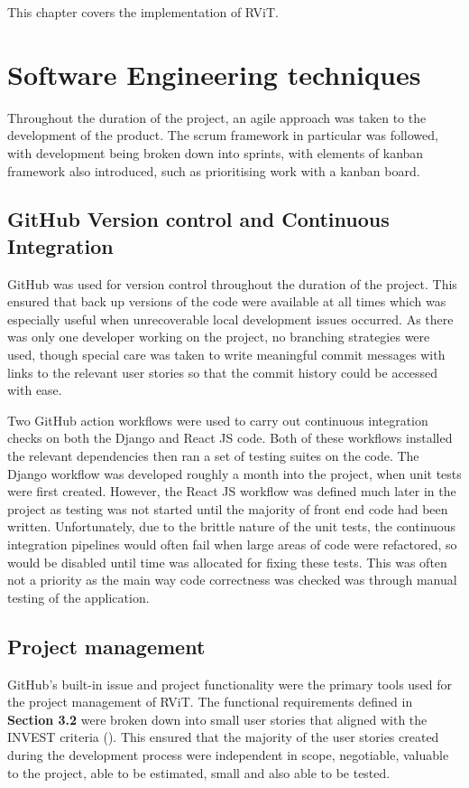 \documentclass[l4proj.tex]{subfiles}
\begin{document}
    

This chapter covers the implementation of RViT. 

\section{Software Engineering techniques}
Throughout the duration of the project, an agile approach was taken to the development of the product. The scrum framework in particular was followed, with development being broken down into sprints, with elements of kanban framework also introduced, such as prioritising work with a kanban board.


\subsection{GitHub Version control and Continuous Integration}
GitHub was used for version control throughout the duration of the project. This ensured that back up versions of the code were available at all times which was especially useful when unrecoverable local development issues occurred. As there was only one developer working on the project, no branching strategies were used, though special care was taken to write meaningful commit messages with links to the relevant user stories so that the commit history could be accessed with ease. 

Two GitHub action workflows were used to carry out continuous integration checks on both the Django and React JS code. Both of these workflows installed the relevant dependencies then ran a set of testing suites on the code. The Django workflow was developed roughly a month into the project, when unit tests were first created. However, the React JS workflow was defined much later in the project as testing was not started until the majority of front end code had been written. Unfortunately, due to the brittle nature of the unit tests, the continuous integration pipelines would often fail when large areas of code were refactored, so would be disabled until time was allocated for fixing these tests. This was often not a priority as the main way code correctness was checked was through manual testing of the application.

\subsection{Project management}
GitHub's built-in issue and project functionality were the primary tools used for the project management of RViT. The functional requirements defined in \textbf{Section 3.2} were broken down into small user stories that aligned with the INVEST criteria (\cite{Buglione2013}). This ensured that the majority of the user stories created during the development process were independent in scope, negotiable, valuable to the project, able to be estimated, small and also able to be tested. 
\end{document}
